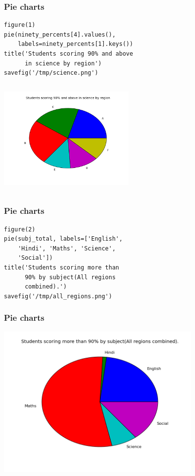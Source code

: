 \documentclass[14pt,compress]{beamer}
\begin{document}
\begin{frame}[fragile]
  \frametitle{Pie charts}
  \small
  \begin{lstlisting}
figure(1)
pie(ninety_percents[4].values(), 
    labels=ninety_percents[1].keys())
title('Students scoring 90% and above 
      in science by region')
savefig('/tmp/science.png')
  \end{lstlisting}
\begin{columns}
    \hspace*{1.1in}
\includegraphics[height=2in, interpolate=true]{data/science}
\end{columns}
\end{frame}

\begin{frame}[fragile]
  \frametitle{Pie charts}
  \begin{lstlisting}
figure(2)
pie(subj_total, labels=['English',
    'Hindi', 'Maths', 'Science',
    'Social'])
title('Students scoring more than
      90% by subject(All regions
      combined).')
savefig('/tmp/all_regions.png')
  \end{lstlisting}
\end{frame}

\begin{frame}[fragile]
  \frametitle{Pie charts}
  \includegraphics[height=3in, interpolate=true]{data/all_regions}
\end{frame}
\end{document}
